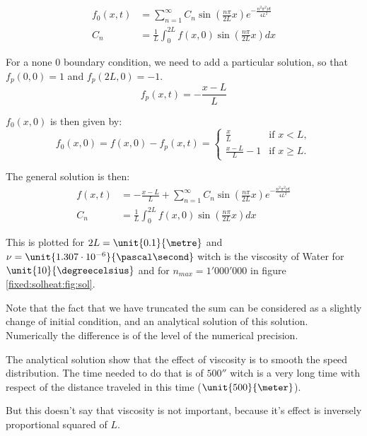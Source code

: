 \begin{align}
  f_0(x,t)&=\sum_{n=1}^{\infty}C_{n}\sin\left(\frac{n\pi}{2L}x\right)e^{-\frac{n^2\pi^2\nu t}{4L^2}}\\
  C_{n}&=\frac{1}{L}\int_{0}^{2L}f(x,0)\sin\left(\frac{n\pi}{2L}x\right) dx
\end{align}

For a none 0 boundary condition, we need to add a particular solution, so that $f_p(0,0)=1$ and $f_p(2L,0)=-1$.
\begin{equation}
	f_{p}(x,t)=-\frac{x-L}{L}
\end{equation}

$f_{0}(x,0)$ is then given by:
\begin{equation}
  f_{0}(x,0)=f(x,0)-f_{p}(x,t)=\begin{cases}
                               	\frac{x}{L}&\text{if $x<L$},\\
                               	\frac{x-L}{L}-1&\text{if $x\geq L$.}
                               \end{cases}
\end{equation}

The general solution is then:
\begin{align}
  f(x,t)&=-\frac{x-L}{L}+\sum_{n=1}^{\infty}C_{n}\sin\left(\frac{n\pi}{2L}x\right)e^{-\frac{n^2\pi^2\nu t}{4L^2}}\\
  C_{n}&=\frac{1}{L}\int_{0}^{2L}f(x,0)\sin\left(\frac{n\pi}{2L}x\right) dx
\end{align}

This is plotted for $2L=\unit{0.1}{\metre}$ and $\nu=\unit{1.307\cdot 10^{-6}}{\pascal\second}$ witch is the viscosity of Water for $\unit{10}{\degreecelsius}$ and for $n_{max}=1'000'000$ in figure \ref{fixed:solheat:fig:sol}.

Note that the fact that we have truncated the sum can be considered as a slightly change of initial condition, and an analytical solution of this solution.
Numerically the difference is of the level of the numerical precision.



The analytical solution show that the effect of viscosity is to smooth the speed distribution. The time needed to do that is of $\unit{500}{\second}$
witch is a very long time with respect of the distance traveled in this time ($\unit{500}{\meter}$).

But this doesn't say that viscosity is not important, because it's effect is inversely proportional squared of $L$.

